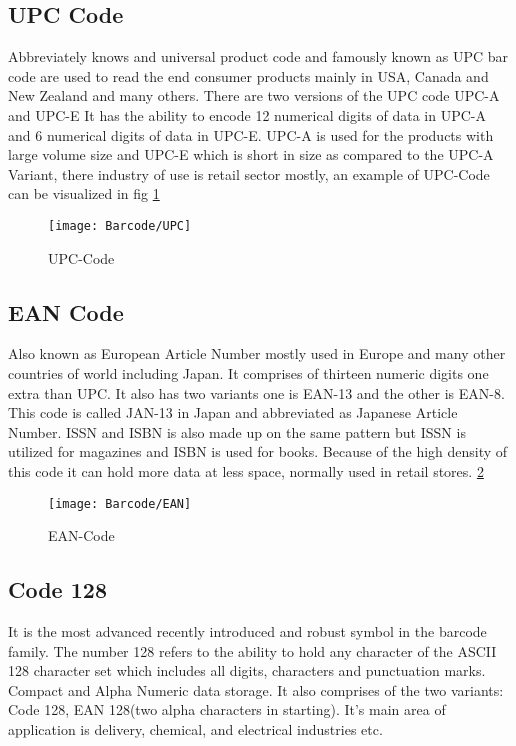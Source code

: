 \subsection{UPC Code}

Abbreviately knows and universal product code and famously known as UPC bar code are used to read the end consumer products mainly in USA, Canada and New Zealand and many others. There are two versions of the UPC code UPC-A and UPC-E It has the ability to encode 12 numerical digits of data in UPC-A and 6 numerical digits of data in UPC-E. UPC-A is used for the products with large volume size and UPC-E which is short in size as compared to the UPC-A Variant, there industry of use is retail sector mostly, an example of UPC-Code can be visualized in fig \ref{UPC}

\begin{figure}
	\begin{center}
		\texttt{[image: Barcode/UPC]}
		\caption{UPC-Code}\label{UPC}
	\end{center}
\end{figure}

\subsection{EAN Code}

Also known as European Article Number mostly used in Europe and many other countries of world including Japan. It comprises of thirteen numeric digits one extra than UPC. It also has two variants one is EAN-13 and the other is EAN-8. This code is called JAN-13 in Japan and abbreviated as Japanese Article Number. 
ISSN and ISBN	is also made up on the same pattern but ISSN is utilized for magazines and ISBN is used for books.
Because of the high density of this code it can hold more data at less space, normally used in retail stores. \ref{EAN}

\begin{figure}
	\begin{center}
		\texttt{[image: Barcode/EAN]}
		\caption{EAN-Code}\label{EAN}
	\end{center}
\end{figure}

\subsection{Code 128}

It is the most advanced recently introduced and robust symbol in the barcode family. The number 128 refers to the ability to hold any character of the ASCII 128 character set which includes all digits, characters and punctuation marks. Compact and Alpha Numeric data storage.
It also comprises of the two variants: Code 128, EAN 128(two alpha characters in starting). It’s main area of application is delivery, chemical, and electrical industries etc. 


